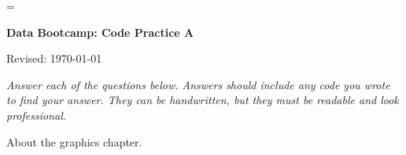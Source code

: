 \documentclass[11pt]{exam}
\begin{document}
\parskip=\bigskipamount
\parindent=0.0in
\thispagestyle{empty}


\bigskip\bigskip
\centerline{\Large \bf Data Bootcamp:  Code Practice A}
\centerline{Revised: \today}

{\it Answer each of the questions below.
Answers should include any code you wrote to find your answer.
They can be handwritten, but they must be readable and look professional.}

\begin{questions}
\item About the graphics chapter.  
\end{questions}


\end{document}
